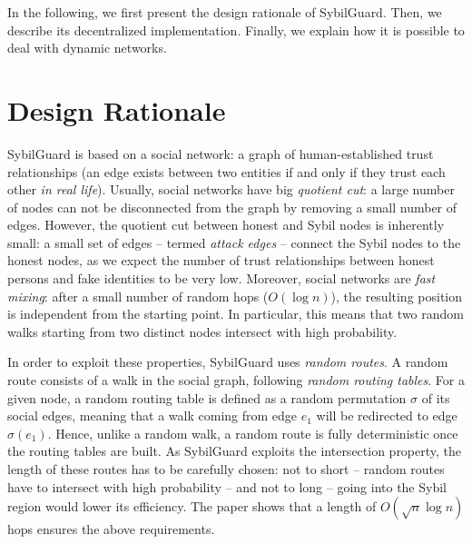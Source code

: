\documentclass[a4paper,11pt]{article}
\begin{document}

In the following, we first present the design rationale of SybilGuard.
Then, we describe its decentralized implementation. Finally, we
explain how it is possible to deal with dynamic networks. 


\section{Design Rationale}


SybilGuard is based on a social network: a graph of
human-established trust relationships (an edge exists between two
entities if and only if they trust each other \emph{in real
life}). Usually, social networks have big \emph{quotient cut}: a large
number of nodes can not be disconnected from the graph by
removing a small number of edges. However, the quotient cut between
honest and Sybil nodes is inherently small: a small set of edges --
termed \emph{attack edges} -- connect the Sybil nodes to the honest
nodes, as we expect the number of trust relationships between honest
persons and fake identities to be very low. Moreover, social networks
are \emph{fast mixing}: after a small number of random hops ($O(\log
n)$), the resulting position is independent from the starting
point.  In particular, this means that two random walks starting from
two distinct nodes intersect with high probability.


In order to exploit these properties, SybilGuard uses \emph{random
routes}. A random route consists of a walk in the social graph,
following \emph{random routing tables}. For a given node, a random routing
table is defined as a random permutation $\sigma$ of its social edges,
meaning that a walk coming from edge $e_1$ will be redirected to edge
$\sigma(e_1)$. Hence, unlike a random walk, a random route is fully
deterministic once the routing tables are built.
As SybilGuard exploits the intersection property, the length of these
routes has to be carefully chosen: not to short -- random routes have
to intersect with high probability -- and not to long -- going into
the Sybil region would lower its efficiency.  The paper shows that a
length of $O(\sqrt{n} \log n)$ hops ensures the above requirements.
\end{document}
